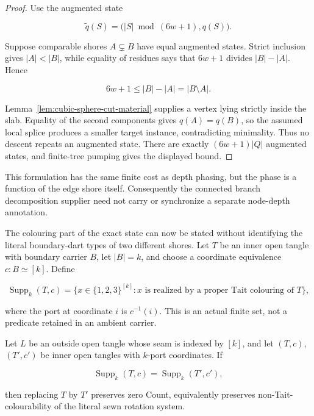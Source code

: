 \begin{proof}
Use the augmented state

\[
       \widetilde q(S)=\bigl(|S|\bmod(6w+1),q(S)\bigr).
\]

Suppose comparable shores $A\subsetneq B$ have equal augmented states.
Strict inclusion gives $|A|<|B|$, while equality of residues says that
$6w+1$ divides $|B|-|A|$.  Hence

\[
                 6w+1\le |B|-|A|=|B\setminus A|.
\]

Lemma~\ref{lem:cubic-sphere-cut-material} supplies a vertex lying strictly
inside the slab.  Equality of the second components gives $q(A)=q(B)$, so
the assumed local splice produces a smaller target instance, contradicting
minimality.  Thus no descent repeats an augmented state.  There are exactly
$(6w+1)|Q|$ augmented states, and finite-tree pumping gives the displayed
bound.
\end{proof}

This formulation has the same finite cost as depth phasing, but the phase is
a function of the edge shore itself.  Consequently the connected branch
decomposition supplier need not carry or synchronize a separate node-depth
annotation.

The colouring part of the exact state can now be stated without identifying
the literal boundary-dart types of two different shores.  Let \(T\) be an
inner open tangle with boundary carrier \(B\), let \(|B|=k\), and choose a
coordinate equivalence \(c:B\simeq [k]\).  Define

\[
 \operatorname{Supp}_{k}(T,c)
   =\bigl\{x\in\{1,2,3\}^{[k]}:
       x\text{ is realized by a proper Tait colouring of }T\bigr\},
\]

where the port at coordinate \(i\) is \(c^{-1}(i)\).  This is an actual finite
set, not a predicate retained in an ambient carrier.

\begin{theorem}
\label{thm:normalized-exact-count-replacement}
Let \(L\) be an outside open tangle whose seam is indexed by \([k]\), and let
\((T,c)\), \((T',c')\) be inner open tangles with \(k\)-port coordinates.  If

\[
             \operatorname{Supp}_{k}(T,c)
             =\operatorname{Supp}_{k}(T',c'),
\]

then replacing \(T\) by \(T'\) preserves zero Count, equivalently preserves
non-Tait-colourability of the literal sewn rotation system.
\end{theorem}

